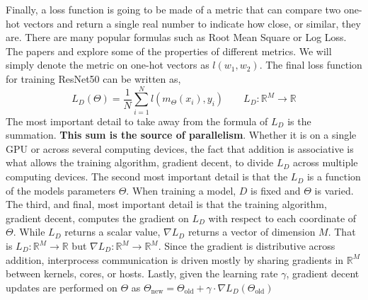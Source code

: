 Finally, a loss function is going to be made of a metric that can compare two one-hot vectors and return a single real number to indicate how close, or similar, they are. There are many popular formulas such as Root Mean Square or Log Loss. The papers \cite{nguyen2018on} and \cite{janocha2017loss} explore some of the properties of different metrics. We will simply denote the metric on one-hot vectors as $l(w_1, w_2)$. The final loss function for training ResNet50 can be written as,
$$
L_D(\Theta) = \frac{1}{N}\sum_{i=1}^N l(m_\Theta(x_i), y_i) \qquad L_D: \mathbb{R}^M \to \mathbb{R}
$$
The most important detail to take away from the formula of $L_D$ is the summation. \textbf{This sum is the source of parallelism}. Whether it is  on a single GPU or across several computing devices, the fact that addition is associative is what allows the training algorithm, gradient decent, to divide $L_D$ across multiple computing devices. The second most important detail is that the $L_D$ is a function of the models parameters $\Theta$. When training a model, $D$ is fixed and $\Theta$ is varied. The third, and final, most important detail is that the training algorithm, gradient decent, computes the gradient on $L_D$ with respect to each coordinate of $\Theta$. While $L_D$ returns a scalar value,  $\nabla L_D$ returns a vector of dimension $M$. That is $L_D : \mathbb{R}^M \to \mathbb{R}$ but $\nabla L_D: \mathbb{R}^M \to \mathbb{R}^M$. Since the gradient is distributive across addition, interprocess communication is driven mostly by sharing gradients in $\mathbb{R}^M$ between kernels, cores, or hosts. Lastly, given the learning rate $\gamma$, gradient decent updates are performed on $\Theta$ as $\Theta_{\mbox{new}} = \Theta_{\mbox{old}} + \gamma \cdot \nabla L_D(\Theta_{\mbox{old}})$
